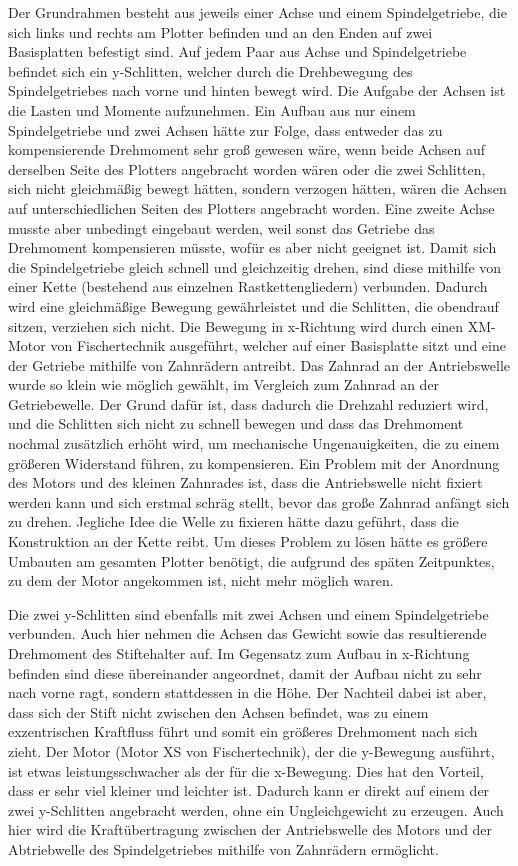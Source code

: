 \documentclass[conference,compsoc,final,a4paper]{IEEEtran}
\begin{document}
Der Grundrahmen besteht aus jeweils einer Achse und einem Spindelgetriebe, die sich links und rechts am Plotter befinden und an den Enden auf zwei Basisplatten befestigt sind. Auf jedem Paar aus Achse und Spindelgetriebe befindet sich ein y-Schlitten, welcher durch die Drehbewegung des Spindelgetriebes nach vorne und hinten bewegt wird. Die Aufgabe der Achsen ist die Lasten und Momente aufzunehmen. Ein Aufbau aus nur einem Spindelgetriebe und zwei Achsen hätte zur Folge, dass entweder das zu kompensierende Drehmoment sehr groß gewesen wäre, wenn beide Achsen auf derselben Seite des Plotters angebracht worden wären oder die zwei Schlitten, sich nicht gleichmäßig bewegt hätten, sondern verzogen hätten, wären die Achsen auf unterschiedlichen Seiten des Plotters angebracht worden. Eine zweite Achse musste aber unbedingt eingebaut werden, weil sonst das Getriebe das Drehmoment kompensieren müsste, wofür es aber nicht geeignet ist.
Damit sich die Spindelgetriebe gleich schnell und gleichzeitig drehen, sind diese mithilfe von einer Kette (bestehend aus einzelnen Rastkettengliedern) verbunden. Dadurch wird eine gleichmäßige Bewegung gewährleistet und die Schlitten, die obendrauf sitzen, verziehen sich nicht. Die Bewegung in x-Richtung wird durch einen XM-Motor von Fischertechnik ausgeführt, welcher auf einer Basisplatte sitzt und eine der Getriebe mithilfe von Zahnrädern antreibt. Das Zahnrad an der Antriebswelle wurde so klein wie möglich gewählt, im Vergleich zum Zahnrad an der Getriebewelle. Der Grund dafür ist, dass dadurch die Drehzahl reduziert wird, und die Schlitten sich nicht zu schnell bewegen und dass das Drehmoment nochmal zusätzlich erhöht wird, um mechanische Ungenauigkeiten, die zu einem größeren Widerstand führen, zu kompensieren. Ein Problem mit der Anordnung des Motors und des kleinen Zahnrades ist, dass die Antriebswelle nicht fixiert werden kann und sich erstmal schräg stellt, bevor das große Zahnrad anfängt sich zu drehen. Jegliche Idee die Welle zu fixieren hätte dazu geführt, dass die Konstruktion an der Kette reibt. Um dieses Problem zu lösen hätte es größere Umbauten am gesamten Plotter benötigt, die aufgrund des späten Zeitpunktes, zu dem der Motor angekommen ist, nicht mehr möglich waren. 

Die zwei y-Schlitten sind ebenfalls mit zwei Achsen und einem Spindelgetriebe verbunden. Auch hier nehmen die Achsen das Gewicht sowie das resultierende Drehmoment des Stiftehalter auf. Im Gegensatz zum Aufbau in x-Richtung befinden sind diese übereinander angeordnet, damit der Aufbau nicht zu sehr nach vorne ragt, sondern stattdessen in die Höhe. Der Nachteil dabei ist aber, dass sich der Stift nicht zwischen den Achsen befindet, was zu einem exzentrischen Kraftfluss führt und somit ein größeres Drehmoment nach sich zieht. 
Der Motor (Motor XS von Fischertechnik), der die y-Bewegung ausführt, ist etwas leistungsschwacher als der für die x-Bewegung. Dies hat den Vorteil, dass er sehr viel kleiner und leichter ist. Dadurch kann er direkt auf einem der zwei y-Schlitten angebracht werden, ohne ein Ungleichgewicht zu erzeugen. Auch hier wird die Kraftübertragung zwischen der Antriebswelle des Motors und der Abtriebwelle des Spindelgetriebes mithilfe von Zahnrädern ermöglicht. 
\end{document}
